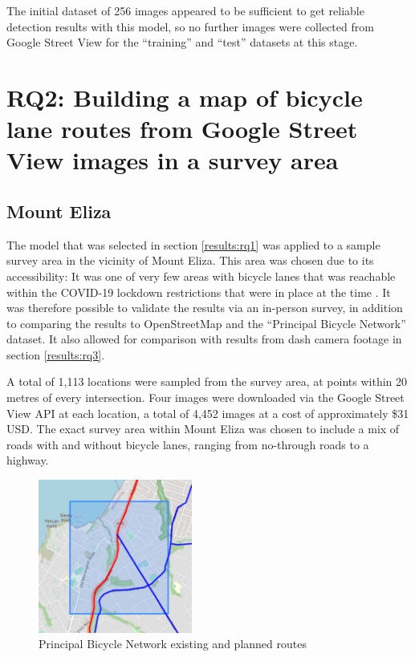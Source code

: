 \documentclass[11pt,twoside]{report}
\begin{document}
The initial dataset of 256 images appeared to be sufficient to get reliable detection results with this model, so no further images were collected from Google Street View for the ``training'' and ``test'' datasets at this stage.


\section{RQ2: Building a map of bicycle lane routes from Google Street View images in a survey area}
\label{results:rq2}

\subsection{Mount Eliza}
\label{results:rq2a}

The model that was selected in section \ref{results:rq1} was applied to a sample survey area in the vicinity of Mount Eliza.  This area was chosen due to its accessibility:  It was one of very few areas with bicycle lanes that was reachable within the COVID-19 lockdown restrictions that were in place at the time \cite{lockdown_record} \cite{lockdown_5km}.  It was therefore possible to validate the results via an in-person survey, in addition to comparing the results to OpenStreetMap and the ``Principal Bicycle Network'' dataset.  It also allowed for comparison with results from dash camera footage in section \ref{results:rq3}.

A total of 1,113 locations were sampled from the survey area, at points within 20 metres of every intersection.  Four images were downloaded via the Google Street View API at each location, a total of 4,452 images at a cost of approximately \$31 USD.  The exact survey area within Mount Eliza was chosen to include a mix of roads with and without bicycle lanes, ranging from no-through roads to a highway.

\begin{figure}[h]
\centering
\includegraphics[width=0.45\textwidth]{map1_5.png}
\caption{Principal Bicycle Network existing and planned routes}
\label{fig:rq2c}
\end{figure}
\end{document}
